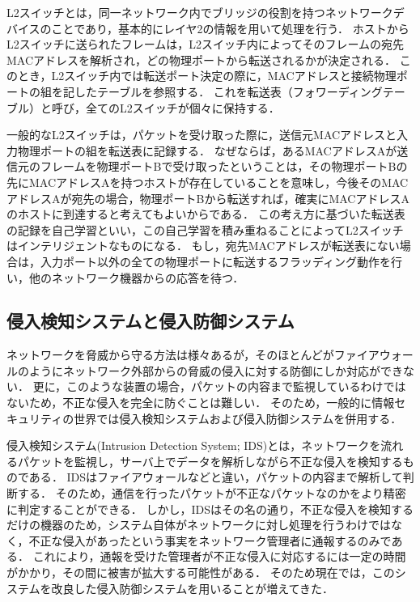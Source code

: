 L2スイッチとは，同一ネットワーク内でブリッジの役割を持つネットワークデバイスのことであり，基本的にレイヤ2の情報を用いて処理を行う\cite{masteringtcpip}．
ホストからL2スイッチに送られたフレームは，L2スイッチ内によってそのフレームの宛先MACアドレスを解析され，どの物理ポートから転送されるかが決定される．
このとき，L2スイッチ内では転送ポート決定の際に，MACアドレスと接続物理ポートの組を記したテーブルを参照する．
これを転送表（フォワーディングテーブル）と呼び，全てのL2スイッチが個々に保持する．

一般的なL2スイッチは，パケットを受け取った際に，送信元MACアドレスと入力物理ポートの組を転送表に記録する．
なぜならば，あるMACアドレスAが送信元のフレームを物理ポートBで受け取ったということは，その物理ポートBの先にMACアドレスAを持つホストが存在していることを意味し，今後そのMACアドレスAが宛先の場合，物理ポートBから転送すれば，確実にMACアドレスAのホストに到達すると考えてもよいからである．
この考え方に基づいた転送表の記録を自己学習といい，この自己学習を積み重ねることによってL2スイッチはインテリジェントなものになる．
もし，宛先MACアドレスが転送表にない場合は，入力ポート以外の全ての物理ポートに転送するフラッディング動作を行い，他のネットワーク機器からの応答を待つ．

\subsection{侵入検知システムと侵入防御システム}

ネットワークを脅威から守る方法は様々あるが，そのほとんどがファイアウォールのようにネットワーク外部からの脅威の侵入に対する防御にしか対応ができない．
更に，このような装置の場合，パケットの内容まで監視しているわけではないため，不正な侵入を完全に防ぐことは難しい．
そのため，一般的に情報セキュリティの世界では侵入検知システムおよび侵入防御システムを併用する．

侵入検知システム(Intrusion Detection System; IDS)とは，ネットワークを流れるパケットを監視し，サーバ上でデータを解析しながら不正な侵入を検知するものである\cite{idsandips}．
IDSはファイアウォールなどと違い，パケットの内容まで解析して判断する．
そのため，通信を行ったパケットが不正なパケットなのかをより精密に判定することができる．
しかし，IDSはその名の通り，不正な侵入を検知するだけの機器のため，システム自体がネットワークに対し処理を行うわけではなく，不正な侵入があったという事実をネットワーク管理者に通報するのみである．
これにより，通報を受けた管理者が不正な侵入に対応するには一定の時間がかかり，その間に被害が拡大する可能性がある．
そのため現在では，このシステムを改良した侵入防御システムを用いることが増えてきた．

